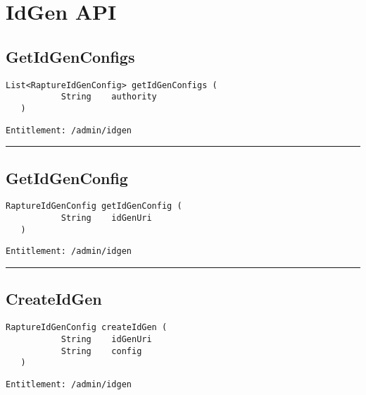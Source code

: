 \chapter{IdGen API}

\section{GetIdGenConfigs}
\label{Api:GetIdGenConfigs}
\begin{lstlisting}[style=nonumbers]
   List<RaptureIdGenConfig> getIdGenConfigs (
           String    authority
   )
\end{lstlisting}
\begin{Verbatim}[formatcom=\color{Maroon}]
  Entitlement: /admin/idgen
\end{Verbatim}



\rule{12cm}{2pt}
\section{GetIdGenConfig}
\label{Api:GetIdGenConfig}
\begin{lstlisting}[style=nonumbers]
   RaptureIdGenConfig getIdGenConfig (
           String    idGenUri
   )
\end{lstlisting}
\begin{Verbatim}[formatcom=\color{Maroon}]
  Entitlement: /admin/idgen
\end{Verbatim}



\rule{12cm}{2pt}
\section{CreateIdGen}
\label{Api:CreateIdGen}
\begin{lstlisting}[style=nonumbers]
   RaptureIdGenConfig createIdGen (
           String    idGenUri
           String    config
   )
\end{lstlisting}
\begin{Verbatim}[formatcom=\color{Maroon}]
  Entitlement: /admin/idgen
\end{Verbatim}



